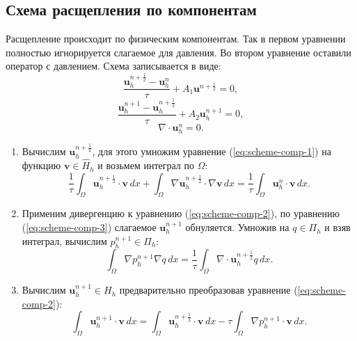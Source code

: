 \documentclass[12pt]{article}
\begin{document}
\subsection{Схема расщепления по компонентам} 
Расщепление происходит по физическим компонентам. Так в первом уравнении полностью игнорируется слагаемое для давления. Во втором уравнение оставили оператор с давлением. Схема записывается в виде:
\begin{equation} \label{eq:scheme-comp-1}
\frac{{\bm u}_h^{n+\frac{1}{2}}-{\bm u}_h^n}{\tau} + A_1 {\bm u}^{n+\frac{1}{2}}=0,
\end{equation} 
\begin{equation} \label{eq:scheme-comp-2}
\frac{{\bm u}_h^{n+1}-{\bm u}_h^{n+\frac{1}{2}}}{\tau} + A_2 {\bm u}_h^{n+1}=0,
\end{equation}
\begin{equation} \label{eq:scheme-comp-3}
\nabla \cdot {\bm u}_h^n = 0.
\end{equation}
\begin{enumerate}
\item 
Вычислим ${\bm u}_h^{n+\frac{1}{2}}$, для этого умножим уравнение (\ref{eq:scheme-comp-1}) на функцию ${\bm v} \in \hat H_h$ и возьмем интеграл по $\Omega$:
$$
\frac{1}{\tau}\int_{\Omega} {\bm u}_h^{n+\frac{1}{2}}\cdot {\bm v} \,dx + \int_{\Omega} \nabla {\bm u}_h^{n+\frac{1}{2}} \cdot \nabla {\bm v} \,dx = \frac{1}{\tau} \int_{\Omega} {\bm u}_h^{n} \cdot {\bm v} \,dx.
$$
\item 
Применим дивергенцию к уравнению (\ref{eq:scheme-comp-2}), по уравнению (\ref{eq:scheme-comp-3}) слагаемое ${\bm u}_h^{n+1}$ обнуляется. Умножив на $q \in \Pi_h$ и взяв интеграл, вычислим $p_h^{n+1} \in \Pi_h$:
$$
\int_{\Omega} \nabla p_h^{n+1} \nabla q \,dx = \frac{1}{\tau} \int_{\Omega} \nabla \cdot {\bm u}_h^{n+\frac{1}{2}} q \,dx.
$$
\item 
Вычислим ${\bm u}_h^{n+1} \in H_h$ предварительно преобразовав уравнение (\ref{eq:scheme-comp-2}):
$$
\int_{\Omega} {\bm u}_h^{n+1} \cdot {\bm v}\,dx = \int_{\Omega} {\bm u}_h^{n+\frac{1}{2}} \cdot {\bm v} \, dx - \tau \int_{\Omega} \nabla p_h^{n+1} \cdot {\bm v} \,dx.
$$
\end{enumerate}
\end{document}
